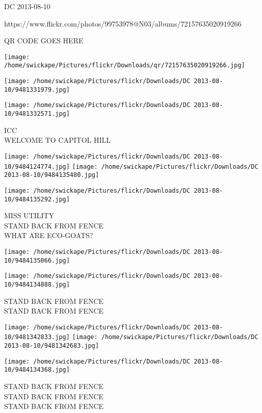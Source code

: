 \documentclass[10pt,letterpaper]{article}
\begin{document}
DC 2013-08-10

https://www.flickr.com/photos/99753978@N03/albums/72157635020919266

QR CODE GOES HERE

\texttt{[image: /home/swickape/Pictures/flickr/Downloads/qr/72157635020919266.jpg]}
\pagebreak

\texttt{[image: /home/swickape/Pictures/flickr/Downloads/DC 2013-08-10/9481331979.jpg]}

\vspace{0.25in}
\texttt{[image: /home/swickape/Pictures/flickr/Downloads/DC 2013-08-10/9481332571.jpg]}

ICC\\
WELCOME TO CAPITOL HILL\\
\pagebreak

\texttt{[image: /home/swickape/Pictures/flickr/Downloads/DC 2013-08-10/9484124774.jpg]}
\texttt{[image: /home/swickape/Pictures/flickr/Downloads/DC 2013-08-10/9484135480.jpg]}

\vspace{0.25in}
\texttt{[image: /home/swickape/Pictures/flickr/Downloads/DC 2013-08-10/9484135292.jpg]}

MISS UTILITY\\
STAND BACK FROM FENCE\\
WHAT ARE ECO{-}GOATS?\\
\pagebreak

\texttt{[image: /home/swickape/Pictures/flickr/Downloads/DC 2013-08-10/9484135066.jpg]}

\vspace{0.25in}
\texttt{[image: /home/swickape/Pictures/flickr/Downloads/DC 2013-08-10/9484134888.jpg]}

STAND BACK FROM FENCE\\
STAND BACK FROM FENCE\\
\pagebreak

\texttt{[image: /home/swickape/Pictures/flickr/Downloads/DC 2013-08-10/9481342833.jpg]}
\texttt{[image: /home/swickape/Pictures/flickr/Downloads/DC 2013-08-10/9481342683.jpg]}

\vspace{0.25in}
\texttt{[image: /home/swickape/Pictures/flickr/Downloads/DC 2013-08-10/9484134368.jpg]}

STAND BACK FROM FENCE\\
STAND BACK FROM FENCE\\
STAND BACK FROM FENCE\\
\pagebreak
\end{document}
